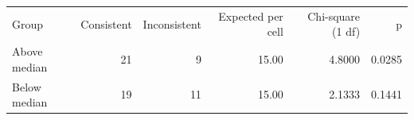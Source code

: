 \begin{tabular}{lrrrrr}
Group & Consistent & Inconsistent & Expected per cell & Chi-square (1 df) & p \\
Above median &  21 &   9 &  15.00 &  4.8000 &  0.0285 \\
Below median &  19 &  11 &  15.00 &  2.1333 &  0.1441 \\
\end{tabular}
